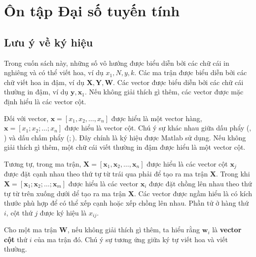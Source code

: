\chapter{Ôn tập Đại số tuyến tính}
\label{cha:linearalgebra}

\section{Lưu ý về ký hiệu}

Trong cuốn sách này, những số vô hướng được biểu diễn bởi các chữ cái 
in nghiêng và có thể viết hoa, ví dụ $x_1, N, y, k$. Các ma trận được biểu diễn
bởi các chữ viết hoa in đậm, ví dụ $\mathbf{X, Y, W} $. Các vector được biểu
diễn bởi các chữ cái thường in đậm, ví dụ $\mathbf{y}, \mathbf{x}_1 $. Nếu
không giải thích gì thêm, các vector được mặc định hiểu là các vector cột.

Đối với vector, $\mathbf{x} = [x_1, x_2, \dots, x_n]$ được hiểu là một vector
hàng, $\mathbf{x} = [x_1; x_2; \dots; x_n] $ được hiểu là vector cột. Chú ý
sự khác nhau giữa dấu phẩy ($,$) và dấu chấm phẩy ($;$). Đây chính là ký hiệu
được Matlab sử dụng. Nếu không giải thích gì thêm, một chữ cái viết thường in
đậm được hiểu là một vector cột.

Tương tự, trong ma trận, $\mathbf{X} = [\mathbf{x}_1, \mathbf{x}_2, \dots,
\mathbf{x}_n]$ được hiểu là các vector cột $\mathbf{x}_j$ được đặt cạnh nhau
theo thứ tự từ trái qua phải để tạo ra ma trận $\mathbf{X}$. Trong khi
$\mathbf{X} = [\mathbf{x}_1; \mathbf{x}_2; \dots; \mathbf{x}_m]$ được hiểu là
các vector $\mathbf{x}_i$ được đặt chồng lên nhau theo thứ tự từ trên xuống dưới
dể tạo ra ma trận $\mathbf{X}$. Các vector được ngầm hiểu là có kích thước phù
hợp để có thể xếp cạnh hoặc xếp chồng lên nhau. Phần tử ở hàng thứ $i$, cột thứ
$j$ được ký hiệu là $x_{ij}$.


Cho một ma trận $\mathbf{W}$, nếu không giải thích gì thêm, ta hiểu rằng
$\mathbf{w}_i$ là \textbf{vector cột} thứ $i$ của ma trận đó. Chú ý sự tương ứng
giữa ký tự viết hoa và viết thường.


